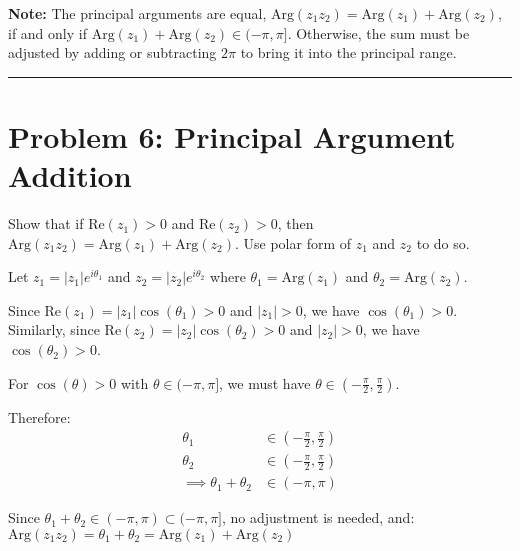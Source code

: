 \documentclass{article}
\begin{document}
\textbf{Note:} The principal arguments are equal, $\text{Arg}(z_1z_2) = \text{Arg}(z_1) + \text{Arg}(z_2)$, if and only if $\text{Arg}(z_1) + \text{Arg}(z_2) \in (-\pi, \pi]$. Otherwise, the sum must be adjusted by adding or subtracting $2\pi$ to bring it into the principal range.

\vspace{.5cm} %

\hrule

\newpage
\section*{Problem 6: Principal Argument Addition}

Show that if $\text{Re}(z_1)>0$ and $\text{Re}(z_2)>0$, then $\text{Arg}(z_1z_2) = \text{Arg}(z_1)+\text{Arg}(z_2)$. Use polar form of $z_1$ and $z_2$ to do so.


Let $z_1 = |z_1|e^{i\theta_1}$ and $z_2 = |z_2|e^{i\theta_2}$ where $\theta_1 = \text{Arg}(z_1)$ and $\theta_2 = \text{Arg}(z_2)$.

Since $\text{Re}(z_1) = |z_1|\cos(\theta_1) > 0$ and $|z_1| > 0$, we have $\cos(\theta_1) > 0$.
Similarly, since $\text{Re}(z_2) = |z_2|\cos(\theta_2) > 0$ and $|z_2| > 0$, we have $\cos(\theta_2) > 0$.

For $\cos(\theta) > 0$ with $\theta \in (-\pi, \pi]$, we must have $\theta \in \left(-\frac{\pi}{2}, \frac{\pi}{2}\right)$.

Therefore:
\begin{align*}
\theta_1 &\in \left(-\frac{\pi}{2}, \frac{\pi}{2}\right) \\
\theta_2 &\in \left(-\frac{\pi}{2}, \frac{\pi}{2}\right) \\
\implies \theta_1 + \theta_2 &\in (-\pi, \pi)
\end{align*}

Since $\theta_1 + \theta_2 \in (-\pi, \pi) \subset (-\pi, \pi]$, no adjustment is needed, and:
$\text{Arg}(z_1z_2) = \theta_1 + \theta_2 = \text{Arg}(z_1) + \text{Arg}(z_2)$
\end{document}
